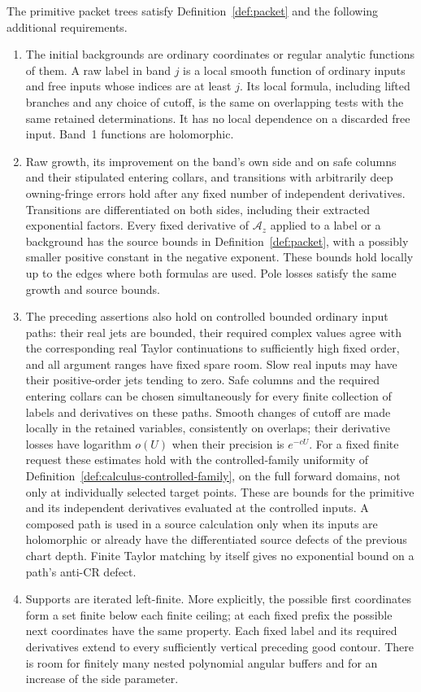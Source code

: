 \begin{assumption}
\label{ass:calculus-primitive}
The primitive packet trees satisfy Definition~\ref{def:packet} and the
following additional requirements.
\begin{enumerate}
\item The initial backgrounds are ordinary coordinates or regular analytic
functions of them.  A raw label in band $j$ is a local smooth function of
ordinary inputs and free inputs whose indices are at least $j$.  Its local
formula, including lifted branches and any choice of cutoff, is the same on
overlapping tests with the same retained determinations.  It has no local
dependence on a discarded free input.  Band~1 functions are holomorphic.
\item Raw growth, its improvement on the band's own side and on safe
columns and their stipulated entering collars, and transitions with
arbitrarily deep owning-fringe errors hold after any fixed number of
independent derivatives.  Transitions are differentiated on both sides,
including their extracted exponential factors.  Every fixed derivative of
$\mathcal A_z$ applied to a label or a background has the source bounds in
Definition~\ref{def:packet}, with a possibly smaller positive constant in the
negative exponent.  These bounds hold locally up to the edges where both
formulas are used.  Pole losses satisfy the same growth and source bounds.
\item The preceding assertions also hold on controlled bounded ordinary
input paths: their real jets are bounded, their required complex values
agree with the corresponding real Taylor continuations to sufficiently
high fixed order, and all argument ranges have fixed spare room.  Slow real
inputs may have their positive-order jets tending to zero.  Safe columns and
the required entering collars can be chosen simultaneously for every finite
collection of labels and derivatives on these paths.  Smooth changes of
cutoff are made locally in the retained variables, consistently on overlaps;
their derivative losses have logarithm $o(U)$ when their precision is
$e^{-cU}$.  For a fixed finite request these estimates hold with the
controlled-family uniformity of
Definition~\ref{def:calculus-controlled-family}, on the full forward
domains, not only at individually selected target points.
These are bounds for the primitive and its independent derivatives
evaluated at the controlled inputs.  A composed path is used in a source
calculation only when its inputs are holomorphic or already have the
differentiated source defects of the previous chart depth.  Finite Taylor
matching by itself gives no exponential bound on a path's anti-CR defect.
\item Supports are iterated left-finite.  More explicitly, the possible
first coordinates form a set finite below each finite ceiling; at each
fixed prefix the possible next coordinates have the same property.  Each
fixed label and its required derivatives extend to every sufficiently
vertical preceding good contour.  There is room for finitely many nested
polynomial angular buffers and for an increase of the side parameter.
\end{enumerate}
\end{assumption}


